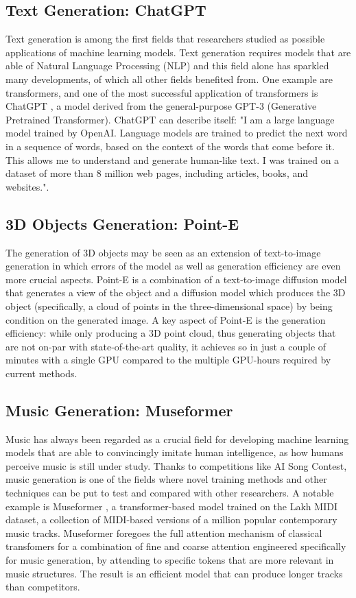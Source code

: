 \documentclass[conference]{IEEEtran}
\begin{document}
\subsection{Text Generation: ChatGPT}
Text generation is among the first fields that researchers studied as possible applications of machine learning models. Text generation requires models that are able of Natural Language Processing (NLP) and this field alone has sparkled many developments, of which all other fields benefited from. One example are transformers, and one of the most successful application of transformers is ChatGPT \cite{chatgpt}, a model derived from the general-purpose GPT-3 (Generative Pretrained Transformer). ChatGPT can describe itself: "I am a large language model trained by OpenAI. Language models are trained to predict the next word in a sequence of words, based on the context of the words that come before it. This allows me to understand and generate human-like text. I was trained on a dataset of more than 8 million web pages, including articles, books, and websites.".
\subsection{3D Objects Generation: Point-E}
The generation of 3D objects may be seen as an extension of text-to-image generation in which errors of the model as well as generation efficiency are even more crucial aspects. Point-E \cite{pointe} is a combination of a text-to-image diffusion model that generates a view of the object and a diffusion model which produces the 3D object (specifically, a cloud of points in the three-dimensional space) by being condition on the generated image. A key aspect of Point-E is the generation efficiency: while only producing a 3D point cloud, thus generating objects that are not on-par with state-of-the-art quality, it achieves so in just a couple of minutes with a single GPU compared to the multiple GPU-hours required by current methods.
\subsection{Music Generation: Museformer}
Music has always been regarded as a crucial field for developing machine learning models that are able to convincingly imitate human intelligence, as how humans perceive music is still under study. Thanks to competitions like AI Song Contest, music generation is one of the fields where novel training methods and other techniques can be put to test and compared with other researchers. A notable example is Museformer \cite{museformer}, a transformer-based model trained on the Lakh MIDI dataset, a collection of MIDI-based versions of a million popular contemporary music tracks. Museformer foregoes the full attention mechanism of classical transfomers for a combination of fine and coarse attention engineered specifically for music generation, by attending to specific tokens that are more relevant in music structures. The result is an efficient model that can produce longer tracks than competitors.
\end{document}
